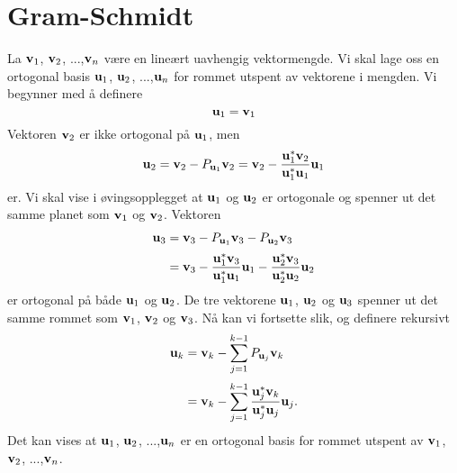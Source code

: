 \section*{Gram-Schmidt}
La $\mathbf{v}_1$, $\mathbf{v}_2$, ...,$\mathbf{v}_n$ være en lineært uavhengig vektormengde. 
Vi skal lage oss en ortogonal basis $\mathbf{u}_1$, $\mathbf{u}_2$, ...,$\mathbf{u}_n$ for rommet utspent av vektorene i mengden. 
Vi begynner med å definere
\[
\mathbf{u}_1=\mathbf{v}_1
\]
Vektoren $\mathbf{v}_2$ er ikke ortogonal på $\mathbf{u}_1$, men 
\[
\mathbf{u}_2=\mathbf{v}_2-P_{\mathbf{u}_1} \mathbf{v}_2=\mathbf{v}_2-\frac{ \mathbf{u}_1^*\mathbf{v}_2}{\mathbf{u}_1^* \mathbf{u}_1}\mathbf{u}_1
\]
er. 
Vi skal vise i øvingsopplegget at   $\mathbf{u}_1$ og $\mathbf{u}_2$ er ortogonale og spenner ut det samme planet som $\mathbf{v}_1$ og $\mathbf{v}_2$.
Vektoren 
\begin{align*}
\mathbf{u}_3&=\mathbf{v}_3-P_{\mathbf{u}_1} \mathbf{v}_3-P_{\mathbf{u}_2} \mathbf{v}_3\\[2pt]&=\mathbf{v}_3-\frac{ \mathbf{u}_1^*\mathbf{v}_3}{\mathbf{u}_1^* \mathbf{u}_1}\mathbf{u}_1-\frac{ \mathbf{u}_2^*\mathbf{v}_3}{\mathbf{u}_2^* \mathbf{u}_2}\mathbf{u}_2
\end{align*}
er ortogonal på både $\mathbf{u}_1$ og $\mathbf{u}_2$. 
De tre vektorene $\mathbf{u}_1$, $\mathbf{u}_2$ og $\mathbf{u}_3$  
spenner ut det samme rommet som $\mathbf{v}_1$, $\mathbf{v}_2$ og $\mathbf{v}_3$. 
Nå kan vi fortsette slik, og definere rekursivt
\begin{align*}
\mathbf{u}_k&=\mathbf{v}_k-\sum_{j=1}^{k-1}P_{\mathbf{u}_j} \mathbf{v}_k\\[2pt]&=\mathbf{v}_k-\sum_{j=1}^{k-1}\frac{ \mathbf{u}_j^*\mathbf{v}_k}{\mathbf{u}_j^* \mathbf{u}_j}\mathbf{u}_j.
\end{align*}
Det kan vises at $\mathbf{u}_1$, $\mathbf{u}_2$, ...,$\mathbf{u}_n$ er en ortogonal basis for rommet utspent av $\mathbf{v}_1$, $\mathbf{v}_2$, ...,$\mathbf{v}_n$.





